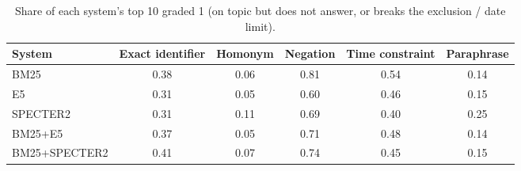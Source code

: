 \begin{table}[t]
\centering
\small
\caption{Share of each system's top 10 graded 1 (on topic but does not answer, or breaks the exclusion / date limit).}
\label{tab:fg1}
\begin{tabular}{lccccc}
\toprule
System & Exact identifier & Homonym & Negation & Time constraint & Paraphrase \\
\midrule
BM25 & 0.38 & 0.06 & 0.81 & 0.54 & 0.14 \\
E5 & 0.31 & 0.05 & 0.60 & 0.46 & 0.15 \\
SPECTER2 & 0.31 & 0.11 & 0.69 & 0.40 & 0.25 \\
BM25+E5 & 0.37 & 0.05 & 0.71 & 0.48 & 0.14 \\
BM25+SPECTER2 & 0.41 & 0.07 & 0.74 & 0.45 & 0.15 \\
\bottomrule
\end{tabular}
\end{table}
